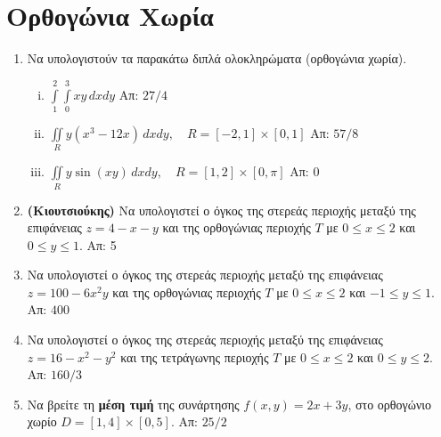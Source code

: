 



\geometry{top=2cm}
\pagestyle{askhseis}
\everymath{\displaystyle}




\begin{center}
  \minibox{\large\bf \textcolor{Col1}{Ασκήσεις Διπλό Ολοκλήρωμα}}
\end{center}


\section*{Ορθογώνια Χωρία}

\begin{enumerate}
  \item Να υπολογιστούν τα παρακάτω διπλά ολοκληρώματα (ορθογώνια χωρία).
    \begin{enumerate}[i)]
      \item $\int\limits_1^2\!\!\!\int\limits_0^ 3xy\,dxdy$ 
        \hfill Απ: ${27}/{4}$ %
      \item $\iint\limits_{R}y(x^3-12x)\,dxdy,\quad R=[-2,1]\times[0,1]$ 
        \hfill Απ: ${57}/{8}$
      \item $ \iint\limits_{R}y\sin(xy)\,dxdy, \quad R=[1,2]\times[0,\pi] $ 
        \hfill Απ: $ 0 $ 
    \end{enumerate}

  \item \textbf{(Κιουτσιούκης)} Να υπολογιστεί ο όγκος της στερεάς περιοχής μεταξύ 
    της επιφάνειας $ z=4-x-y $ και της ορθογώνιας περιοχής $T$ με $ 0 \leq x \leq 2 $ 
    και $ 0 \leq y \leq 1 $. \hfill Απ: 5  

  \item Να υπολογιστεί ο όγκος της στερεάς περιοχής μεταξύ της επιφάνειας 
    $ z = 100 - 6x^{2}y $ και της ορθογώνιας περιοχής $T$ με 
    $ 0 \leq x \leq 2 $ και $ -1 \leq y \leq 1 $. \hfill Απ: $400$ 

  \item Να υπολογιστεί ο όγκος της στερεάς περιοχής μεταξύ της 
    επιφάνειας $ z= 16-x^{2}-y^{2} $ και της τετράγωνης περιοχής $T$ με 
    $ 0 \leq x \leq 2 $ και $ 0 \leq y \leq 2 $. \hfill Απ: $160/3$ 

  \item Να βρείτε τη \textbf{μέση τιμή} της συνάρτησης $ f(x,y)=2x+3y $, στο 
    ορθογώνιο χωρίο $D= [1,4] \times [0,5]$.
    \hfill Απ: $ {25}/{2} $ 


\end{enumerate}
